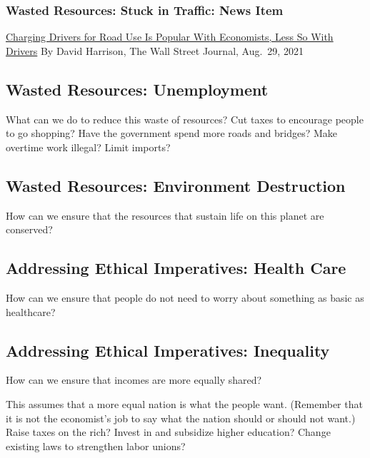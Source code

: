 \documentclass[
  letterpaper,
]{book}
\begin{document}
\subsubsection{Wasted Resources: Stuck in Traffic: News
Item}\label{wasted-resources-stuck-in-traffic-news-item}

\href{https://www.wsj.com/articles/charging-drivers-for-road-use-is-popular-with-economists-less-so-with-drivers-11630245780}{Charging
Drivers for Road Use Is Popular With Economists, Less So With Drivers}
By David Harrison, The Wall Street Journal, Aug.~29, 2021

\subsection{Wasted Resources:
Unemployment}\label{wasted-resources-unemployment}

What can we do to reduce this waste of resources? Cut taxes to encourage
people to go shopping? Have the government spend more roads and bridges?
Make overtime work illegal? Limit imports?

\subsection{Wasted Resources: Environment
Destruction}\label{wasted-resources-environment-destruction}

How can we ensure that the resources that sustain life on this planet
are conserved?

\subsection{Addressing Ethical Imperatives: Health
Care}\label{addressing-ethical-imperatives-health-care}

How can we ensure that people do not need to worry about something as
basic as healthcare?

\subsection{Addressing Ethical Imperatives:
Inequality}\label{addressing-ethical-imperatives-inequality}

How can we ensure that incomes are more equally shared?

This assumes that a more equal nation is what the people want. (Remember
that it is not the economist's job to say what the nation should or
should not want.) Raise taxes on the rich? Invest in and subsidize
higher education? Change existing laws to strengthen labor unions?
\end{document}
